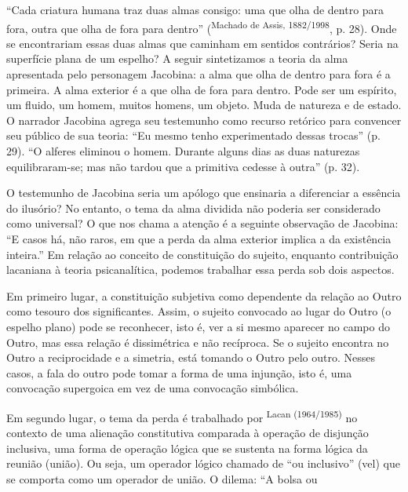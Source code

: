 \begin{multicols}{2}
\par{}“Cada criatura humana traz duas almas consigo:\allowbreak{} uma que olha de dentro para fora,\allowbreak{} outra que olha de fora para dentro” (\allowbreak{}\textsuperscript{Machado de Assis,\allowbreak{} 1882\fshyp{}1998},\allowbreak{} p.\allowbreak{} 28)\allowbreak{}.\allowbreak{} Onde se encontrariam essas duas almas que caminham em sentidos contrários? Seria na superfície plana de um espelho? A seguir sintetizamos a teoria da alma apresentada pelo personagem Jacobina:\allowbreak{} a alma que olha de dentro para fora é a primeira.\allowbreak{} A alma exterior é a que olha de fora para dentro.\allowbreak{} Pode ser um espírito,\allowbreak{} um fluido,\allowbreak{} um homem,\allowbreak{} muitos homens,\allowbreak{} um objeto.\allowbreak{} Muda de natureza e de estado.\allowbreak{} O narrador Jacobina agrega seu testemunho como recurso retórico para convencer seu público de sua teoria:\allowbreak{} “Eu mesmo tenho experimentado dessas trocas” (\allowbreak{}p.\allowbreak{} 29)\allowbreak{}.\allowbreak{} “O alferes eliminou o homem.\allowbreak{} Durante alguns dias as duas naturezas equilibraram-\allowbreak{}se; mas não tardou que a primitiva cedesse à outra” (\allowbreak{}p.\allowbreak{} 32)\allowbreak{}.\allowbreak{}\par{}O testemunho de Jacobina seria um apólogo que ensinaria a diferenciar a essência do ilusório? No entanto,\allowbreak{} o tema da alma dividida não poderia ser considerado como universal? O que nos chama a atenção é a seguinte observação de Jacobina:\allowbreak{} “E casos há,\allowbreak{} não raros,\allowbreak{} em que a perda da alma exterior implica a da existência inteira.\allowbreak{}” Em relação ao conceito de constituição do sujeito,\allowbreak{} enquanto contribuição lacaniana à teoria psicanalítica,\allowbreak{} podemos trabalhar essa perda sob dois aspectos.\allowbreak{}\par{}Em primeiro lugar,\allowbreak{} a constituição subjetiva como dependente da relação ao Outro como tesouro dos significantes.\allowbreak{} Assim,\allowbreak{} o sujeito convocado ao lugar do Outro (\allowbreak{}o espelho plano)\allowbreak{} pode se reconhecer,\allowbreak{} isto é,\allowbreak{} ver a si mesmo aparecer no campo do Outro,\allowbreak{} mas essa relação é dissimétrica e não recíproca.\allowbreak{} Se o sujeito encontra no Outro a reciprocidade e a simetria,\allowbreak{} está tomando o Outro pelo outro.\allowbreak{} Nesses casos,\allowbreak{} a fala do outro pode tomar a forma de uma injunção,\allowbreak{} isto é,\allowbreak{} uma convocação supergoica em vez de uma convocação simbólica.\allowbreak{}\par{}Em segundo lugar,\allowbreak{} o tema da perda é trabalhado por \textsuperscript{Lacan (\allowbreak{}1964\fshyp{}1985)\allowbreak{}} no contexto de uma alienação constitutiva comparada à operação de disjunção inclusiva,\allowbreak{} uma forma de operação lógica que se sustenta na forma lógica da reunião (\allowbreak{}união)\allowbreak{}.\allowbreak{} Ou seja,\allowbreak{} um operador lógico chamado de “ou inclusivo” (\allowbreak{}vel)\allowbreak{} que se comporta como um operador de união.\allowbreak{} O dilema:\allowbreak{} “A bolsa ou 
\end{multicols}
